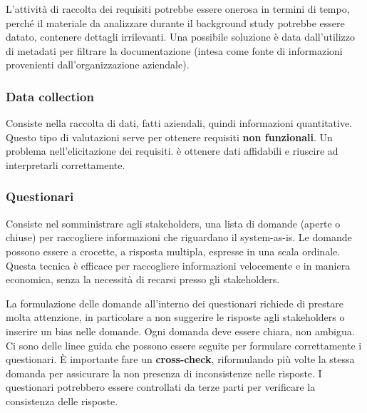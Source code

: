 \documentclass[italian]{article}
\begin{document}
	 L'attività di raccolta dei requisiti potrebbe essere onerosa in termini di tempo, perché il materiale da analizzare durante il background study potrebbe essere datato, contenere dettagli irrilevanti. Una possibile soluzione è data dall'utilizzo di metadati per filtrare la documentazione (intesa come fonte di informazioni provenienti dall'organizzazione aziendale).

	 \subsubsection{Data collection}
	 Consiste nella raccolta di dati, fatti aziendali, quindi informazioni quantitative. Questo tipo di valutazioni serve per ottenere requisiti \textbf{non funzionali}. Un problema nell'elicitazione dei requisiti. è ottenere dati affidabili e riuscire ad interpretarli correttamente.
	 \subsubsection{Questionari} Consiste nel somministrare agli stakeholders, una lista di domande (aperte o chiuse) per raccogliere informazioni che riguardano il system-as-is. Le domande possono essere a crocette, a risposta multipla, espresse in una scala ordinale. Questa tecnica è efficace per raccogliere informazioni velocemente e in maniera economica, senza la necessità di recarsi presso gli stakeholders.

	 La formulazione delle domande all'interno dei questionari richiede di prestare molta attenzione,   in particolare a non suggerire le risposte agli stakeholders o inserire un bias nelle domande. Ogni domanda deve essere chiara, non ambigua. Ci sono delle linee guida che possono essere seguite per formulare correttamente i questionari. È importante fare un \textbf{cross-check}, riformulando più volte la stessa domanda per assicurare la non presenza di inconsistenze nelle risposte.
	 I questionari potrebbero essere controllati da terze parti per verificare la consistenza delle risposte.
\end{document}

